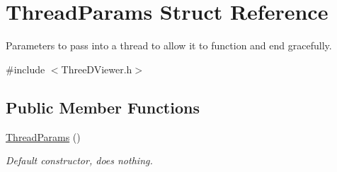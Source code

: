 \hypertarget{struct_thread_params}{
\section{ThreadParams Struct Reference}
\label{struct_thread_params}
}


Parameters to pass into a thread to allow it to function and end gracefully.  




{\ttfamily \#include $<$ThreeDViewer.h$>$}

\subsection*{Public Member Functions}
\begin{DoxyCompactItemize}
\item 
\hypertarget{struct_thread_params_a5298e23e502407049aad460f0be63c3a}{
\hyperlink{struct_thread_params_a5298e23e502407049aad460f0be63c3a}{ThreadParams} ()}
\label{struct_thread_params_a5298e23e502407049aad460f0be63c3a}

\begin{DoxyCompactList}\small\item\em Default constructor, does nothing. \end{DoxyCompactList}\end{DoxyCompactItemize}
